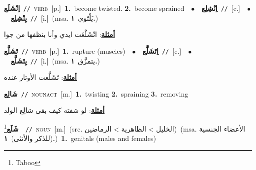 \documentclass[10pt,a4paper,twoside]{article} %
\begin{document}
\begin{multicols}{2}
{\setlength\topsep{0pt}\textbf{\foreignlanguage{arabic}{اِنْشَلَع}}\ {\color{gray}\texttt{//}\color{black}}\ \textsc{verb}\ [p.]\ \textbf{1.}~become twisted.  \textbf{2.}~become sprained\ \ $\bullet$\ \ \setlength\topsep{0pt}\textbf{\foreignlanguage{arabic}{اِنْشِلِع}}\ {\color{gray}\texttt{//}\color{black}}\ [c.]\ \ $\bullet$\ \ \setlength\topsep{0pt}\textbf{\foreignlanguage{arabic}{يِنْشِلِع}}\ {\color{gray}\texttt{//}\color{black}}\ [i.]\ \color{gray}(msa. \foreignlanguage{arabic}{يَلْتَوي}~\foreignlanguage{arabic}{\textbf{١.}})\color{black}\  \begin{flushright}\color{gray}\foreignlanguage{arabic}{\textbf{\underline{\foreignlanguage{arabic}{أمثلة}}}: انْشَلْعَت ايدي وأنا بنظفها من جوا}\end{flushright}\color{black}} \vspace{2mm}

{\setlength\topsep{0pt}\textbf{\foreignlanguage{arabic}{تَشَلَّع}}\ {\color{gray}\texttt{//}\color{black}}\ \textsc{verb}\ [p.]\ \textbf{1.}~rupture (muscles)\ \ $\bullet$\ \ \setlength\topsep{0pt}\textbf{\foreignlanguage{arabic}{اِتَشَلَّع}}\ {\color{gray}\texttt{//}\color{black}}\ [c.]\ \ $\bullet$\ \ \setlength\topsep{0pt}\textbf{\foreignlanguage{arabic}{يِتَشَلَّع}}\ {\color{gray}\texttt{//}\color{black}}\ [i.]\ \color{gray}(msa. \foreignlanguage{arabic}{يتمزَّق}~\foreignlanguage{arabic}{\textbf{١.}})\color{black}\  \begin{flushright}\color{gray}\foreignlanguage{arabic}{\textbf{\underline{\foreignlanguage{arabic}{أمثلة}}}: تَشَلَّعت الأوتار عنده}\end{flushright}\color{black}} \vspace{2mm}

{\setlength\topsep{0pt}\textbf{\foreignlanguage{arabic}{شَالِع}}\ {\color{gray}\texttt{//}\color{black}}\ \textsc{noun\textunderscore act}\ [m.]\ \textbf{1.}~twisting  \textbf{2.}~spraining  \textbf{3.}~removing\  \begin{flushright}\color{gray}\foreignlanguage{arabic}{\textbf{\underline{\foreignlanguage{arabic}{أمثلة}}}: لو شفته كيف بقى شالِع الولد}\end{flushright}\color{black}} \vspace{2mm}

{\setlength\topsep{0pt}\textbf{\foreignlanguage{arabic}{شَلَع}}\footnote{Taboo}\ \ {\color{gray}\texttt{//}\color{black}}\ \textsc{noun}\ [m.]\ (src. \color{gray}\foreignlanguage{arabic}{الخليل > الظاهرية > الرماضين}\color{black})\ \color{gray}(msa. \foreignlanguage{arabic}{الأعضاء الجنسية (للذكر والأنثى)}~\foreignlanguage{arabic}{\textbf{١.}})\color{black}\ \textbf{1.}~genitals (males and females)\ } \vspace{2mm}


\end{multicols}
\end{document}
